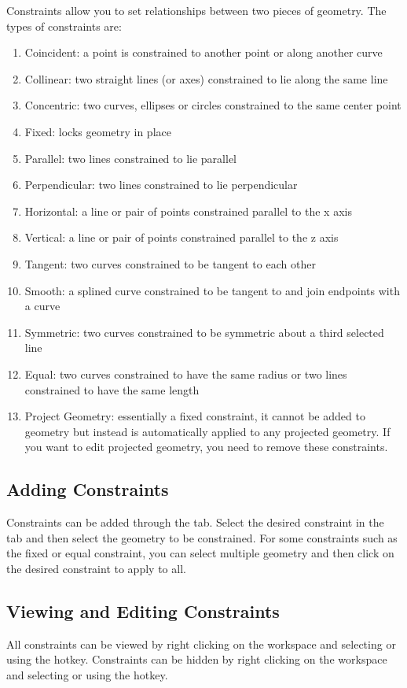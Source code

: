 Constraints allow you to set relationships between two pieces of geometry. The types of constraints are:

\begin{enumerate}
\item Coincident: a point is constrained to another point or along another curve
\item Collinear: two straight lines (or axes) constrained to lie along the same line
\item Concentric: two curves, ellipses or circles constrained to the same center point
\item Fixed: locks geometry in place
\item Parallel: two lines constrained to lie parallel
\item Perpendicular: two lines constrained to lie perpendicular
\item Horizontal: a line or pair of points constrained parallel to the x axis
\item Vertical: a line or pair of points constrained parallel to the z axis
\item Tangent: two curves constrained to be tangent to each other
\item Smooth: a splined curve constrained to be tangent to and join endpoints with a curve
\item Symmetric: two curves constrained to be symmetric about a third selected line
\item Equal: two curves constrained to have the same radius or two lines constrained to have the same length
\item Project Geometry: essentially a fixed constraint, it cannot be added to geometry but instead is automatically applied to any projected geometry. If you want to edit projected geometry, you need to remove these constraints.
\end{enumerate}


\subsection{Adding Constraints}
Constraints can be added through the  tab. Select the desired constraint in the tab and then select the geometry to be constrained. For some constraints such as the fixed or equal constraint, you can select multiple geometry and then click on the desired constraint to apply to all.
\subsection{Viewing and Editing Constraints}
All constraints can be viewed by right clicking on the workspace and selecting \newline {} or using the  hotkey. Constraints can be hidden by right clicking on the workspace and selecting  or using the  hotkey.

